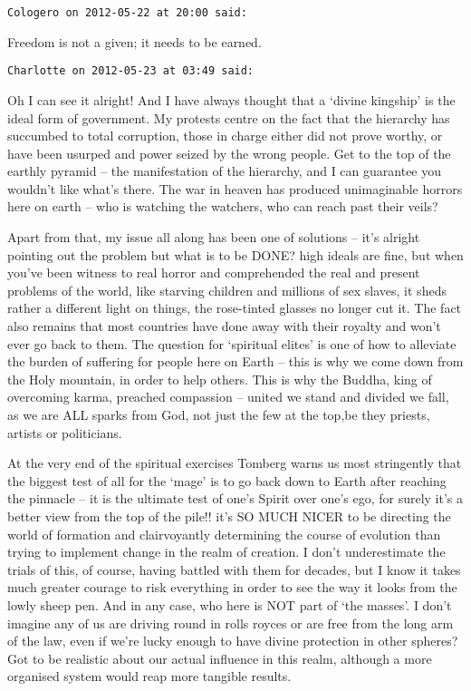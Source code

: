 \begin{footnotesize}
\begin{sffamily}
\hfill

\texttt{Cologero on 2012-05-22 at 20:00 said: }

Freedom is not a given; it needs to be earned.


\hfill

\texttt{Charlotte on 2012-05-23 at 03:49 said: }

Oh I can see it alright! And I have always thought that a `divine kingship' is the ideal form of government. My protests centre on the fact that the hierarchy has succumbed to total corruption, those in charge either did not prove worthy, or have been usurped and power seized by the wrong people. Get to the top of the earthly pyramid – the manifestation of the hierarchy, and I can guarantee you wouldn't like what's there. The war in heaven has produced unimaginable horrors here on earth – who is watching the watchers, who can reach past their veils?

Apart from that, my issue all along has been one of solutions – it's alright pointing out the problem but what is to be DONE? high ideals are fine, but when you've been witness to real horror and comprehended the real and present problems of the world, like starving children and millions of sex slaves, it sheds rather a different light on things, the rose-tinted glasses no longer cut it. The fact also remains that most countries have done away with their royalty and won't ever go back to them. The question for `spiritual elites' is one of how to alleviate the burden of suffering for people here on Earth – this is why we come down from the Holy mountain, in order to help others. This is why the Buddha, king of overcoming karma, preached compassion – united we stand and divided we fall, as we are ALL sparks from God, not just the few at the top,be they priests, artists or politicians.

At the very end of the spiritual exercises Tomberg warns us most stringently that the biggest test of all for the `mage' is to go back down to Earth after reaching the pinnacle – it is the ultimate test of one's Spirit over one's ego, for surely it's a better view from the top of the pile!! it's SO MUCH NICER to be directing the world of formation and clairvoyantly determining the course of evolution than trying to implement change in the realm of creation. I don't underestimate the trials of this, of course, having battled with them for decades, but I know it takes much greater courage to risk everything in order to see the way it looks from the lowly sheep pen. And in any case, who here is NOT part of `the masses'. I don't imagine any of us are driving round in rolls royces or are free from the long arm of the law, even if we're lucky enough to have divine protection in other spheres? Got to be realistic about our actual influence in this realm, although a more organised system would reap more tangible results.


\end{sffamily}
\end{footnotesize}
